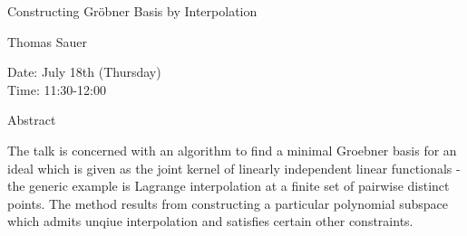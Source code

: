 \begin{center}
\LARGE
Constructing Gr\"obner Basis by Interpolation
\end{center}

\begin{center}
\Large
Thomas Sauer
\end{center}

\noindent
Date:  July 18th (Thursday) \\
Time:  11:30-12:00\\

\begin{center}
\large
Abstract
\end{center}

The talk is concerned with an algorithm to find a minimal Groebner basis for an ideal which is
given as the joint kernel of linearly independent linear functionals - the generic example is
Lagrange interpolation at a finite set of pairwise distinct points. The method results from
constructing a particular polynomial subspace which admits unqiue interpolation and satisfies
certain other constraints. 

